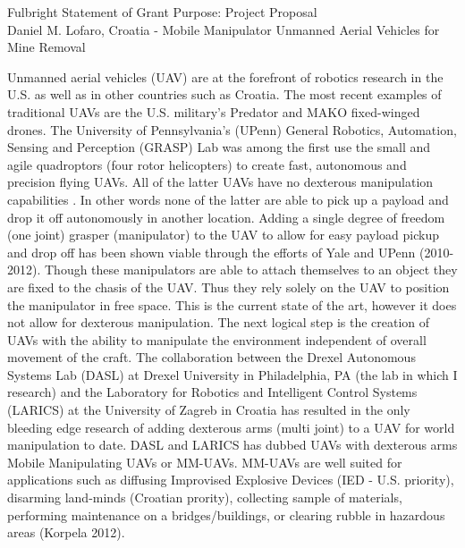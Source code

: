 \documentclass[12pt]{article}
\begin{document}
\begin{center}
Fulbright Statement of Grant Purpose: Project Proposal\\
Daniel M. Lofaro, Croatia - 
Mobile Manipulator Unmanned Aerial Vehicles for Mine Removal\\

\end{center}

Unmanned aerial vehicles (UAV) are at the forefront of robotics research in the U.S. as well as in other countries such as Croatia.  
The most recent examples of traditional UAVs are the U.S. military's Predator and MAKO fixed-winged drones.  
The University of Pennsylvania's (UPenn) General Robotics, Automation, Sensing and Perception (GRASP) Lab was among the first use the small and agile quadroptors (four rotor helicopters) to create fast, autonomous and precision flying UAVs.  
All of the latter UAVs have no dexterous manipulation capabilities .
In other words none of the latter are able to pick up a payload and drop it off autonomously in another location.
Adding a single degree of freedom (one joint) grasper (manipulator) to the UAV to allow for easy payload pickup and drop off has been shown viable through the efforts of Yale and UPenn (2010-2012). 
Though these manipulators are able to attach themselves to an object they are fixed to the chasis of the UAV.
Thus they rely solely on the UAV to position the manipulator in free space.  
This is the current state of the art, however it does not allow for dexterous manipulation.  
The next logical step is the creation of UAVs with the ability to manipulate the environment independent of overall movement of the craft.  
The collaboration between the Drexel Autonomous Systems Lab (DASL) at Drexel University in Philadelphia, PA (the lab in which I research) and the Laboratory for Robotics and Intelligent Control Systems (LARICS) at the University of Zagreb in Croatia has resulted in the only bleeding edge research of adding dexterous arms (multi joint) to a UAV for world manipulation to date.  DASL and LARICS has dubbed UAVs with dexterous arms Mobile Manipulating UAVs or MM-UAVs. 
MM-UAVs are well suited for applications such as diffusing Improvised Explosive Devices (IED - U.S. priority), disarming land-minds (Croatian prority), collecting sample of materials, performing maintenance on a bridges/buildings, or clearing rubble in hazardous areas (Korpela 2012).  
\end{document}
